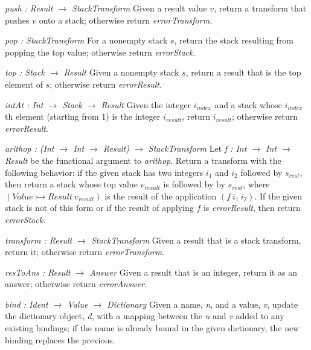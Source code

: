 \documentclass[12pt]{report}
\begin{document}
\hangindent=10mm {\em push : Result $\rightarrow$ StackTransform} \newline
Given a result value $v$, return a transform that pushes $v$ onto a stack; otherwise return {\em errorTransform}.

\hangindent=10mm {\em pop : StackTransform}\newline
For a nonempty stack $s$, return the stack resulting from popping the top value; otherwise return {\em errorStack}.

\hangindent=10mm {\em top : Stack $\rightarrow$ Result} \newline
Given a nonempty stack $s$, return a result that is the top element of $s$; otherwise return {\em errorResult}.

\hangindent=10mm {\em intAt : Int $\rightarrow$ Stack $\rightarrow$ Result} \newline
Given the integer $i_{index}$ and a stack whose $i_{index}$th element (starting from 1) is the integer $i_{result}$, return $i_{result}$; otherwise return {\em errorResult}. 

\hangindent=10mm {\em arithop : (Int $\rightarrow$ Int $\rightarrow$ Result) $\rightarrow$ StackTransform} \newline
Let {\em f : Int $\rightarrow$ Int $\rightarrow$ Result} be the functional argument to {\em arithop}.  Return a transform with the following behavior: if the given stack has two integers $i_1$ and $i_2$ followed by $s_{rest}$, then return a stack whose top value $v_{result}$ is followed by by $s_{rest}$, where $(Value \rightarrowtail Result\ v_{result})$ is the result of the application $(f\ i_1\ i_2)$. If the given stack is not of this form or if the result of applying $f$ is {\em errorResult}, then return {\em errorStack}.

\hangindent=10mm {\em transform : Result $\rightarrow$ StackTransform} \newline
Given a result that is a stack transform, return it; otherwise return {\em errorTransform}.

\hangindent=10mm {\em resToAns : Result $\rightarrow$ Answer} \newline
Given a result that is an integer, return it as an answer; otherwise return {\em errorAnswer}.

\hangindent=10mm {\em bind : Ident $\rightarrow$ Value $\rightarrow$ Dictionary} \newline
Given a name, {\em n}, and a value, {\em v}, update the dictionary object, {\em d}, with a mapping between the {\em n} and {\em v} added to any existing bindings; if the name is already bound in the given dictionary, the new binding replaces the previous.
\end{document}

